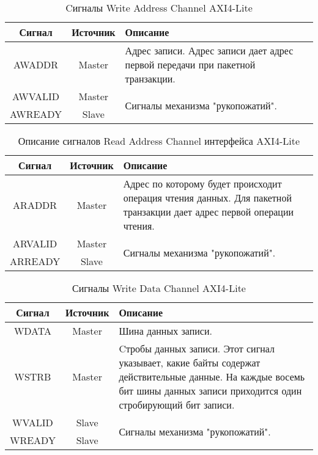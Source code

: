 \renewcommand{\arraystretch}{1.1} %

\begin{table}[!ht]
	\centering
	\caption{Cигналы Write Address Channel AXI4-Lite}
	\label{WA}
	\begin{tabular}{c c p{}} 
		\toprule
		Сигнал & Источник & Описание \\ 
		\midrule
		AWADDR & Master & Адрес записи. Адрес записи дает адрес 
		первой передачи при пакетной транзакции. \\
		AWVALID & Master  & \multirow{2}{*}{Сигналы механизма "рукопожатий".} \\ 
		AWREADY & Slave  &   \\
		\bottomrule
	\end{tabular}
\end{table}

\begin{table}[!ht]
		\centering
		\caption{Описание сигналов Read Address Channel интерфейса AXI4-Lite}
		\label{RA}
		\begin{tabular}{ c  c  p{} } 
			\toprule
			Сигнал & Источник & Описание \\ 
			\midrule 
			ARADDR & Master & Адрес по которому будет происходит операция чтения данных. Для пакетной транзакции дает адрес первой операции чтения.\\
			ARVALID & Master  & \multirow{2}{*}{Сигналы механизма "рукопожатий".} \\ 
			ARREADY & Slave  & \\
			\bottomrule
		\end{tabular}
\end{table}

\begin{table}[!ht]
	\centering
	\caption{Сигналы Write Data Channel AXI4-Lite}
	\label{WD}
	\begin{tabular}{ c  c  p{} } 
		\toprule
		Сигнал & Источник & Описание \\ 
		\midrule
		WDATA & Master & Шина данных записи. \\ 
		WSTRB & Master  & Cтробы данных записи. Этот сигнал указывает, какие байты содержат действительные данные. На каждые восемь бит шины данных записи приходится один стробирующий бит записи. \\ 
		WVALID & Slave  & \multirow{2}{*}{Сигналы механизма "рукопожатий".} \\ 
		WREADY & Slave  & \\
		\bottomrule
	\end{tabular}

\end{table}

